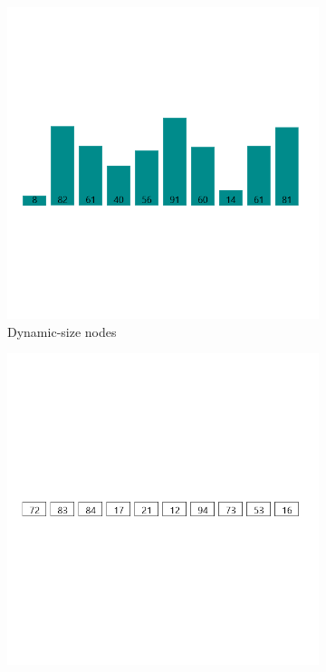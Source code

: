 \documentclass[
  field=inf,
  biblatex,
  language=english,
  glossaries,
  theorems=false,
  index
]{kidiplom}
\begin{document}
\begin{figure}[H]
	\begin{subfigure}{0.31\textwidth}
		\includegraphics[width=\linewidth]{img/dynamic.png}
		\caption{Dynamic-size nodes} \label{fig:1a}
	\end{subfigure}
	\hspace*{\fill} %
	\begin{subfigure}{0.31\textwidth}
		\includegraphics[width=\linewidth]{img/fixed.png}

\end{subfigure}
\end{figure}
\end{document}
